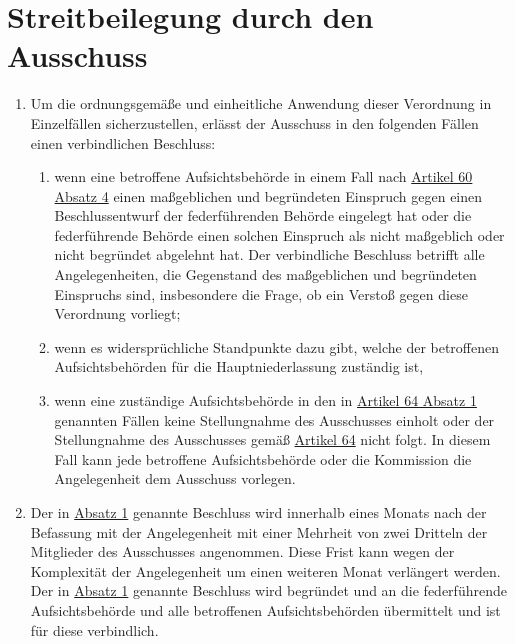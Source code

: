 \chapter{Streitbeilegung durch den Ausschuss}
\label{ch:65}


\begin{enumerate}

  \item Um die ordnungsgemäße und einheitliche Anwendung dieser Verordnung in Einzelfällen sicherzustellen, erlässt der
   Ausschuss in den folgenden Fällen einen verbindlichen Beschluss:
  \label{itm:65-1}

  \begin{enumerate}
  
    \item wenn eine betroffene Aufsichtsbehörde in einem Fall nach \hyperref[itm:60-4]{Artikel 60 Absatz 4} einen
     maßgeblichen und begründeten Einspruch gegen einen Beschlussentwurf der federführenden Behörde eingelegt hat oder
     die federführende Behörde einen solchen Einspruch als nicht maßgeblich oder nicht begründet abgelehnt hat. Der
     verbindliche Beschluss betrifft alle Angelegenheiten, die Gegenstand des maßgeblichen und begründeten Einspruchs
     sind, insbesondere die Frage, ob ein Verstoß gegen diese Verordnung vorliegt;
    \label{itm:65-1a}

    \item wenn es widersprüchliche Standpunkte dazu gibt, welche der betroffenen Aufsichtsbehörden für die
     Hauptniederlassung zuständig ist,
    \label{itm:65-1b}

    \item wenn eine zuständige Aufsichtsbehörde in den in \hyperref[itm:64-1]{Artikel 64 Absatz 1} genannten Fällen
     keine Stellungnahme des Ausschusses einholt oder der Stellungnahme des Ausschusses gemäß \hyperref[ch:64]
     {Artikel 64} nicht folgt. In diesem Fall kann jede betroffene Aufsichtsbehörde oder die Kommission die
     Angelegenheit dem Ausschuss vorlegen.
    \label{itm:65-1c}

  \end{enumerate}

  \item Der in \hyperref[itm:65-1]{Absatz 1} genannte Beschluss wird innerhalb eines Monats nach der Befassung mit der
   Angelegenheit mit einer Mehrheit von zwei Dritteln der Mitglieder des Ausschusses angenommen. Diese Frist kann wegen
   der Komplexität der Angelegenheit um einen weiteren Monat verlängert werden. Der in \hyperref[itm:65-1]{Absatz 1}
   genannte Beschluss wird begründet und an die federführende Aufsichtsbehörde und alle betroffenen Aufsichtsbehörden
   übermittelt und ist für diese verbindlich.
  \label{itm:65-2}


\end{enumerate}
